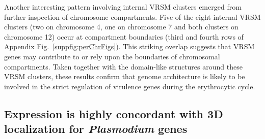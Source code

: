 Another interesting pattern involving internal VRSM clusters emerged from
further inspection of chromosome compartments.  Five of the eight internal
VRSM clusters (two on chromosome 4, one on chromosome 7 and both clusters on
chromosome 12) occur at compartment boundaries (third and fourth rows of
Appendix Fig.~\ref{suppfig:perChrFigs}). This striking overlap  suggests
that VRSM genes may contribute to or rely upon the boundaries of chromosomal
compartments. Taken together with the domain-like structures around these VRSM
clusters, these results confirm that genome architecture is likely to be
involved in the strict regulation of virulence genes during the erythrocytic
cycle.

\subsection{Expression is highly concordant with 3D localization for {\em Plasmodium} genes}

